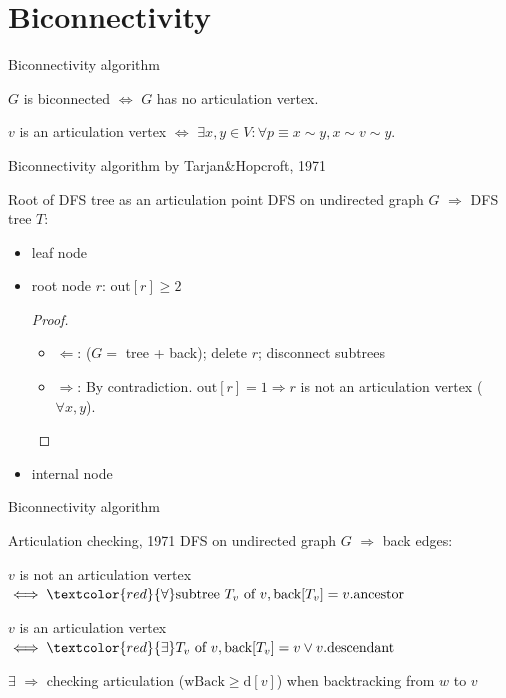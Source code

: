 \section{Biconnectivity}

\begin{frame}{Biconnectivity algorithm}
  \begin{center}
    $G$ is biconnected $\iff$ $G$ has no articulation vertex.

    $v$ is an articulation vertex $\iff$ $\exists x,y \in V: \forall p \equiv x \sim y, x \sim v \sim y$.

    Biconnectivity algorithm by Tarjan\&Hopcroft, 1971
  \end{center}

  \begin{exampleblock}{Root of DFS tree as an articulation point }
    DFS on undirected graph $G$ $\Rightarrow$ DFS tree $T$:
    \begin{itemize}
      \item leaf node
      \item root node $r$: $\text{out}[r] \ge 2$
	\begin{proof}
	  \begin{itemize}
	    \item $\Leftarrow$: ($G = $ tree + back); delete $r$; disconnect subtrees
	    \item $\Rightarrow$: By contradiction. $\text{out}[r] = 1 \Rightarrow r$ is not an articulation vertex ($\forall x,y$).
	  \end{itemize}
	\end{proof}
      \item internal node
    \end{itemize}
  \end{exampleblock}
\end{frame}
\begin{frame}{Biconnectivity algorithm}
  \begin{exampleblock}{Articulation checking, 1971 }
    DFS on undirected graph $G$ $\Rightarrow$ back edges:
    \begin{center}
      $v$ is not an articulation vertex $\iff \textcolor{red}{\forall} \text{subtree } T_{v} \text{ of } v, \text{back}[T_{v}] = v.\text{ancestor}$

      $v$ is an articulation vertex $\iff \textcolor{red}{\exists} T_{v} \text{ of } v, \text{back}[T_{v}] = v \lor v.\text{descendant}$
    \end{center}

    $\exists$ $\Rightarrow$ checking articulation ($\text{wBack} \ge \text{d}[v]$) when backtracking from $w$ to $v$
  \end{exampleblock}
\end{frame}
